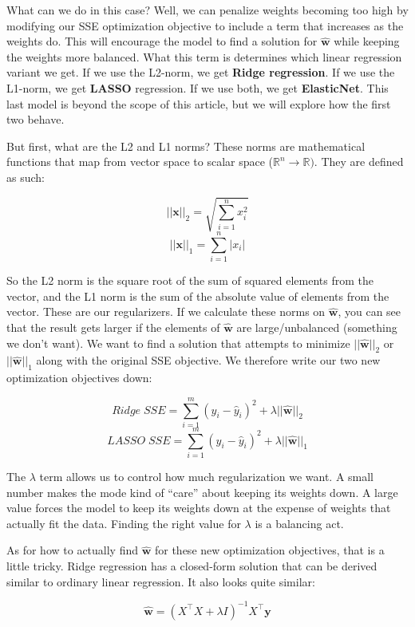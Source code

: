 \begin{flushleft}
    What can we do in this case? Well, we can penalize weights becoming too high by modifying our SSE optimization objective to include a term that increases as the weights do. This will encourage the model to find a solution for $\hat{\textbf{w}}$ while keeping the weights more balanced. What this term is determines which linear regression variant we get. If we use the L2-norm, we get \textbf{Ridge regression}. If we use the L1-norm, we get \textbf{LASSO} regression. If we use both, we get \textbf{ElasticNet}. This last model is beyond the scope of this article, but we will explore how the first two behave. \break

    But first, what are the L2 and L1 norms? These norms are mathematical functions that map from vector space to scalar space ($\mathbb{R}^n \rightarrow \mathbb{R})$. They are defined as such:

    $$||\textbf{x}||_2 = \sqrt{\sum_{i=1}^n x_i^2}$$
    $$||\textbf{x}||_1 = \sum_{i=1}^n |x_i|$$

    So the L2 norm is the square root of the sum of squared elements from the vector, and the L1 norm is the sum of the absolute value of elements from the vector. These are our regularizers. If we calculate these norms on $\hat{\textbf{w}}$, you can see that the result gets larger if the elements of $\hat{\textbf{w}}$ are large/unbalanced (something we don't want). We want to find a solution that attempts to minimize $||\hat{\textbf{w}}||_2$ or $||\hat{\textbf{w}}||_1$ along with the original SSE objective. We therefore write our two new optimization objectives down:

    $$Ridge\;SSE = \sum_{i=1}^{m} (y_i - \hat{y}_i)^2 + \lambda||\hat{\textbf{w}}||_2$$
    $$LASSO\;SSE = \sum_{i=1}^{m} (y_i - \hat{y}_i)^2 + \lambda||\hat{\textbf{w}}||_1$$

    The $\lambda$ term allows us to control how much regularization we want. A small number makes the mode kind of ``care'' about keeping its weights down. A large value forces the model to keep its weights down at the expense of weights that actually fit the data. Finding the right value for $\lambda$ is a balancing act. \break

    As for how to actually find $\hat{\textbf{w}}$ for these new optimization objectives, that is a little tricky. Ridge regression has a closed-form solution that can be derived similar to ordinary linear regression. It also looks quite similar:

    $$\hat{\textbf{w}} = (X^{\top}X + \lambda I)^{-1}X^{\top}\textbf{y}$$


\end{flushleft}

